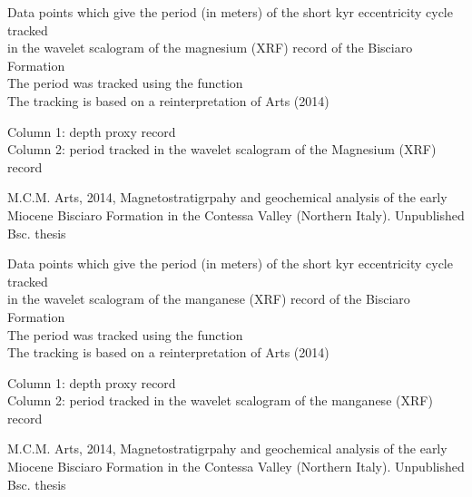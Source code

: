 \documentclass[a4paper]{book}
\begin{document}
%
\begin{Description}
Data points which give the period (in meters) of the short kyr eccentricity cycle tracked \\{}
in the wavelet scalogram of the magnesium (XRF) record of the Bisciaro Formation \\{}
The period was tracked using the  function\\{}
The tracking is based on a reinterpretation of Arts (2014)\\{}
\end{Description}
%
\begin{Details}
Column 1: depth proxy record\\{}
Column 2: period tracked in the wavelet scalogram of the Magnesium (XRF) record
\end{Details}
%
\begin{References}
M.C.M. Arts, 2014,
Magnetostratigrpahy and geochemical analysis of the early Miocene Bisciaro Formation
in the Contessa Valley (Northern Italy). Unpublished Bsc. thesis \\{}
\end{References}
%
\begin{Description}
Data points which give the period (in meters) of the short kyr eccentricity cycle tracked \\{}
in the wavelet scalogram of the manganese (XRF) record of the Bisciaro Formation \\{}
The period was tracked using the  function\\{}
The tracking is based on a reinterpretation of Arts (2014)\\{}
\end{Description}
%
\begin{Details}
Column 1: depth proxy record\\{}
Column 2: period tracked in the wavelet scalogram of the manganese (XRF) record
\end{Details}
%
\begin{References}
M.C.M. Arts, 2014,
Magnetostratigrpahy and geochemical analysis of the early Miocene Bisciaro Formation
in the Contessa Valley (Northern Italy). Unpublished Bsc. thesis \\{}
\end{References}
\end{document}
